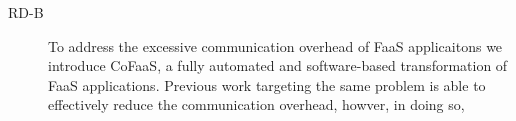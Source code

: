 \documentclass[../main.tex]{subfiles}
\begin{document}
\begin{refsection}
\begin{description}
\item[RD-B] To address the excessive communication overhead of FaaS applicaitons we introduce CoFaaS, a fully automated and software-based transformation of FaaS applications. Previous work targeting the same problem is able to effectively reduce the communication overhead, howver, in doing so, 

\end{description}




 


\ifx\chapincluded\undefined
  \printbibliography
  \end{refsection}
 \fi
\end{document}
